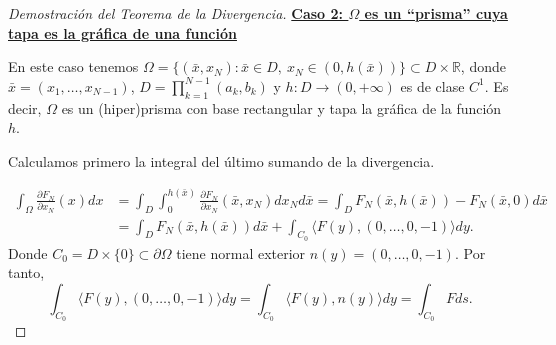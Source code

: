 \documentclass[12pt,spanish]{article}
\theoremstyle{definition}
\theoremstyle{remark}
\begin{document}
\begin{proof}[Demostración del Teorema de la Divergencia]
	\underline{\textbf{Caso 2: $\Omega$ es un ``prisma'' cuya tapa es la gráfica de una función}}
	
	En este caso tenemos $\Omega=\{(\bar{x},x_N):\bar{x}\in D, \ x_N\in (0,h(\bar{x}))\}\subset D\times\mathbb{R}$, donde $\bar{x}=(x_1,\ldots,x_{N-1})$, $\displaystyle{D=\prod_{k=1}^{N-1}(a_k,b_k)}$ y $h:D\rightarrow(0,+\infty)$ es de clase $C^1$.
	Es decir, $\Omega$ es un (hiper)prisma con base rectangular y tapa la gráfica de la función $h$.
	
	Calculamos primero la integral del último sumando de la divergencia.
	
	\begin{align*}
	\int_\Omega\frac{\partial F_N}{\partial x_N}(x)dx&= \int_D\int_0^{h(\bar{x})}\frac{\partial F_N}{\partial x_N}(\bar{x},x_N)d x_N d\bar{x} = \int_D  F_N(\bar{x},h(\bar{x}))-F_N(\bar{x},0) d\bar{x} \\ 
	&= \int_D  F_N(\bar{x},h(\bar{x}))d\bar{x}+\int_{C_0}\langle F(y),(0,\ldots,0,-1) \rangle dy.
	\end{align*}
	Donde $C_0=D\times \{0\}\subset\partial\Omega$ tiene normal exterior $n(y)=(0,\ldots,0,-1)$. Por tanto,
	\[\int_{C_0}\langle F(y),(0,\ldots,0,-1) \rangle dy=\int_{C_0}\langle F(y),n(y)\rangle dy=\int_{C_0}F ds.\]
	

\end{proof}
\end{document}
